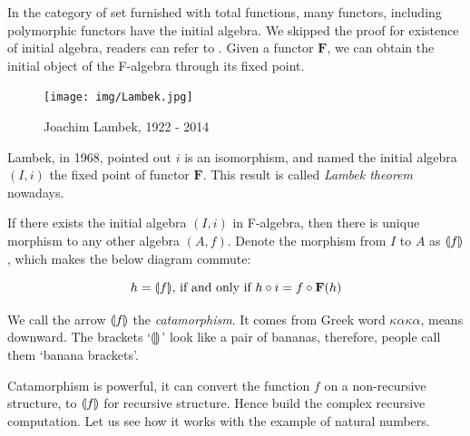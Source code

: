 \documentclass[b5paper]{article}
\begin{document}
In the category of set furnished with total functions, many functors, including polymorphic functors have the initial algebra. We skipped the proof for existence of initial algebra, readers can refer to \cite{Manes-Arbib-1986}. Given a functor $\mathbf{F}$, we can obtain the initial object of the F-algebra through its fixed point.

\begin{figure}[htbp]
 \centering
 \texttt{[image: img/Lambek.jpg]}
 \captionsetup{labelformat=empty}
 \caption{Joachim Lambek, 1922 - 2014}
 \label{fig:Lambek}
\end{figure}

Lambek, in 1968, pointed out $i$ is an isomorphism, and named the initial algebra $(I, i)$ the fixed point of functor $\mathbf{F}$. This result is called {\em Lambek theorem} nowadays\cite{Lambek-1968}.

If there exists the initial algebra $(I, i)$ in F-algebra, then there is unique morphism to any other algebra $(A, f)$. Denote the morphism from $I$ to $A$ as $\llparenthesis f \rrparenthesis$, which makes the below diagram commute:

\begin{center}
\end{center}

\[
  h = \lbb f \rbb \text{, if and only if}\ h \circ i = f \circ \mathbf{F}(h)
\]

We call the arrow $\llparenthesis f \rrparenthesis$ the {\em catamorphism}. It comes from Greek word $\kappa \alpha \kappa \alpha$, means downward. The brackets `$\llparenthesis \rrparenthesis$' look like a pair of bananas, therefore, people call them `banana brackets'.

Catamorphism is powerful, it can convert the function $f$ on a non-recursive structure, to $\llparenthesis f \rrparenthesis$ for recursive structure. Hence build the complex recursive computation. Let us see how it works with the example of natural numbers.
\end{document}
